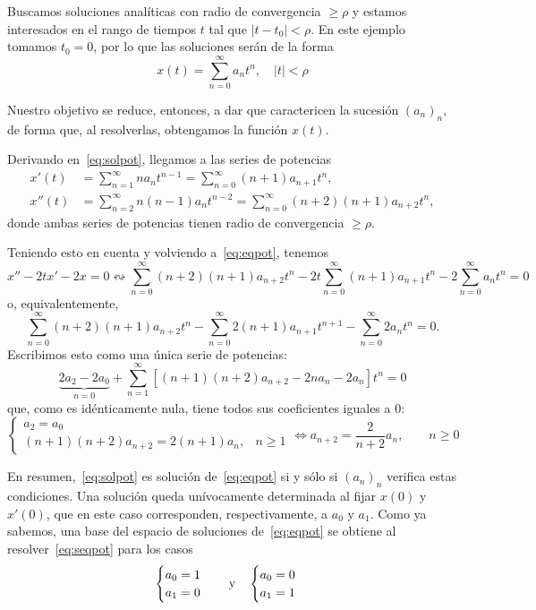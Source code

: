 \documentclass[../ecuaciones_diferenciales.tex]{subfiles}
\begin{document}
\begin{solution}
	Buscamos soluciones analíticas con radio de convergencia \(\geq \rho\) y
	estamos interesados en el rango de tiempos \(t\) tal que \(|t-t_0| <
	\rho\). En este ejemplo tomamos \(t_0 = 0\), por lo que las soluciones serán
	de la forma
	\begin{equation}
		\label{eq:solpot}
		x(t) = \sum_{n=0}^\infty a_n t^n, \quad |t| < \rho
	\end{equation}

	Nuestro objetivo se reduce, entonces, a dar  que 
	caractericen la sucesión \({(a_n)}_n\), de forma que, al resolverlas, 
	obtengamos la función \(x(t)\).

	Derivando en~\eqref{eq:solpot}, llegamos a las series de potencias
	\begin{align*}
		x'(t)  & = \sum_{n=1}^\infty n a_n t^{n-1}
		= \sum_{n=0}^\infty (n+1)a_{n+1}t^n,          \\
		x''(t) & = \sum_{n=2}^\infty n(n-1) a_n t^{n-2}
		= \sum_{n=0}^\infty (n+2)(n+1)a_{n+2} t^n,
	\end{align*}
	donde ambas series de potencias tienen radio de convergencia \(\geq \rho\).

	Teniendo esto en cuenta y volviendo a~\eqref{eq:eqpot}, tenemos
	\[x''-2tx'-2x=0 \leftrightsquigarrow \sum_{n=0}^\infty (n+2)(n+1)a_{n+2}t^n -
		2t \sum_{n=0}^\infty (n+1)a_{n+1}t^n - 2 \sum_{n=0}^\infty a_n t^n = 0\]
	o, equivalentemente,
	\[\sum_{n=0}^\infty (n+2)(n+1)a_{n+2}t^n - \sum_{n=0}^\infty
		2(n+1)a_{n+1}t^{n+1} - \sum_{n=0}^\infty 2 a_n t^n = 0.\]
	Escribimos esto como una única serie de potencias:
	\[\underbrace{2a_2-2a_0}_{n=0} +
		\sum_{n=1}^\infty[(n+1)(n+2)a_{n+2}-2na_n-2a_n]t^n = 0\]
	que, como es idénticamente nula, tiene todos sus coeficientes iguales a 0:
	\begin{equation}
		\label{eq:seqpot}
		\begin{cases}
			a_2 = a_0                                 \\
			(n+1)(n+2)a_{n+2} = 2(n+1)a_n, & n \geq 1
		\end{cases} \iff
		a_{n+2} = \frac{2}{n+2} a_n, \qquad n \geq 0
	\end{equation}

	En resumen,~\eqref{eq:solpot} es solución de~\eqref{eq:eqpot} si y sólo si
	\({(a_n)}_n\) verifica estas condiciones. Una solución queda unívocamente
	determinada al fijar \(x(0)\) y \(x'(0)\), que en este caso corresponden,
	respectivamente, a \(a_0\) y \(a_1\). Como ya sabemos, una base del espacio de
	soluciones de~\eqref{eq:eqpot} se obtiene al resolver~\eqref{eq:seqpot} para los
	casos
	\[\begin{cases}a_0 = 1 \\ a_1 = 0\end{cases}
		\quad \text{y} \quad
		\begin{cases}a_0 = 0 \\ a_1 = 1\end{cases}\]


\end{solution}
\end{document}
